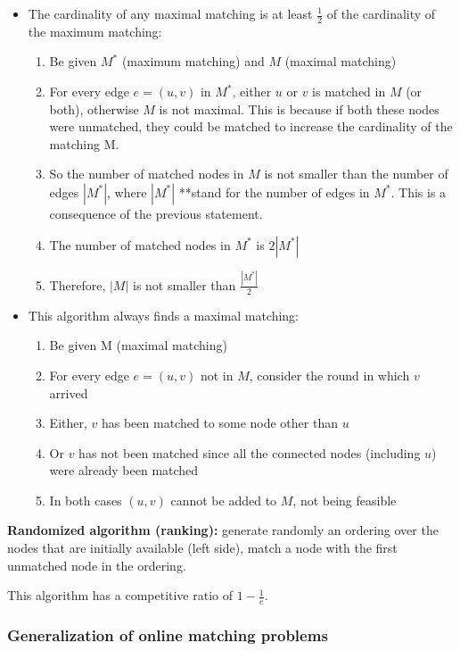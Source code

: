 \documentclass[10pt,a4paper]{article}
\begin{document}
\begin{itemize}

\item The cardinality of any maximal matching is at least $\frac{1}{2}$ of the cardinality of the maximum matching:
\begin{enumerate}
\item Be given $M^*$ (maximum matching) and $M$ (maximal matching)
\item For every edge $e = (u,v)$ in $M^*$, either $u$ or $v$ is matched in $M$ (or both), otherwise $M$ is not maximal. This is because if both these nodes were unmatched, they could be matched to increase the cardinality of the matching M.
\item So the number of matched nodes in $M$ is not smaller than the number of edges $|M^*|$, where $|M^*|$ **stand for the number of edges in $M^*$. This is a consequence of the previous statement.
\item The number of matched nodes in $M^*$ is $2|M^*|$
\item Therefore, $|M|$ is not smaller than $\frac{|M^*|}{2}$
\end{enumerate}
\item This algorithm always finds a maximal matching:
\begin{enumerate}
\item Be given M (maximal matching)
\item For every edge $e = (u,v)$ not in $M$, consider the round in which $v$ arrived
\item Either, $v$ has been matched to some node other than $u$
\item Or $v$ has not been matched since all the connected nodes (including $u$) were already been matched
\item In both cases $(u,v)$ cannot be added to $M$, not being feasible
\end{enumerate}
\end{itemize}

\textbf{Randomized algorithm (ranking):} generate randomly an ordering over the nodes that are initially available (left side), match a node with the first unmatched node in the ordering.

This algorithm has a competitive ratio of $1-\frac{1}{e}$.

\subsubsection{Generalization of online matching problems}\label{generalization-of-online-matching-problems}
\end{document}
